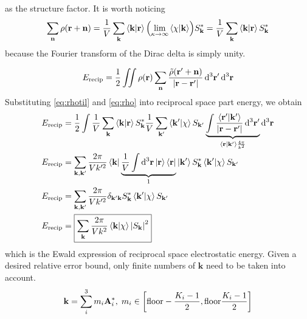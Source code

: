 \documentclass[12pt]{extarticle}
\renewcommand{\bf}{\mathbf}
\begin{document}
    as the structure factor. It is worth noticing \begin{equation}
        \sum_{\bf n} \rho( \bf r + \bf n) = \frac{1}{V}\sum_{\bf k} \bra{\bf k} \ket{\bf r}\pqty{ \lim_{\kappa \to \infty} \bra{\chi }\ket{\bf k}}  S_{\bf k}^* = \frac{1}{V}\sum_{\bf k} \bra{\bf k} \ket{\bf r} S_{\bf k}^* \label{eq:rho}
    \end{equation}
    because the Fourier transform of the Dirac delta is simply unity.

    \[
        E_\text{recip} = \frac{1}{2} \iint \rho(\bf r) \sum_{\bf n} \frac{\tilde{\rho} \pqty{ \bf r' + \bf n}}{\abs{\bf r - \bf r'}} \dd[3]{\bf r'} \dd[3]{\bf r} 
    \]
    Substituting \cref{eq:rhotil} and \cref{eq:rho} into reciprocal space part energy, we obtain \begin{align*}
        E_\text{recip}&= \frac{1}{2} \int \frac{1}{V}\sum_{\bf k} \bra{\bf k} \ket{\bf r} S_{\bf k}^* \frac{1}{V}\sum_{\bf k'}   \bra{\bf k'}  \ket{\chi }  S_{\bf k'} \underbrace{\int \frac{\bra{\bf r'} \ket{\bf k'}}{\abs{\bf r - \bf r'}} \dd[3]{\bf r'} }_{\bra{\bf r} \ket{\bf k'} \frac{4 \pi}{k^2}} \dd[3]{\bf r} \\
        E_\text{recip}&= \sum_{\bf k, \bf k'} \frac{2\pi}{Vk'^2}   \bra{\bf k} \underbrace{\frac{1}{V} \int  \dd[3]{\bf r}\ket{\bf r} \bra{\bf r}}_1 \ket{\bf k'} S_{\bf k}^*   \bra{\bf k'}  \ket{\chi }  S_{\bf k'}\\
        E_\text{recip}&= \sum_{\bf k, \bf k'} \frac{2\pi}{Vk'^2}   \delta_{\bf k' \bf k} S_{\bf k}^*   \bra{\bf k'}  \ket{\chi }  S_{\bf k'}\\
        E_\text{recip}&= \boxed{\sum_{ \bf k} \frac{2\pi}{Vk^2}  \bra{\bf k}  \ket{\chi } \abs{ S_{\bf k}}^2}
    \end{align*}
    which is the Ewald expression of reciprocal space electrostatic energy. Given a desired relative error bound, only finite numbers of \(\bf k\) need to be taken into account. \[
        \bf k = \sum_i^3 m_i \bf A^*_i,\; m_i \in \bqty{\text{floor} - \frac{K_i - 1}{2}, \text{floor} \frac{K_i - 1}{2}  }
    \]
\end{document}
